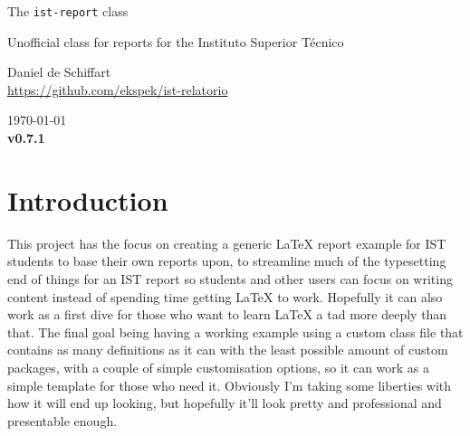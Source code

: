 \documentclass[palatino,english]{ist-report}
\begin{document}
\institution{}
\title{}

\begin{center}
	\vspace*{1cm}
	{\huge The \texttt{ist-report} class}
	\medskip\par
	{\Large Unofficial class for reports for the Instituto Superior Técnico}
	\bigskip\bigskip\par
	{\large Daniel de Schiffart} \\
	{\url{https://github.com/ekspek/ist-relatorio}}
	\bigskip\smallskip\par
	\today \\
	\textbf{v0.7.1}
\end{center}
\vspace*{1cm}

\begin{abstract}
	This \LaTeX{} class was developed as an unofficial template for reports developed for the Instituto Superior Técnico of Universidade de Lisboa, themed around the style the university has developed for its own internal documentation, complemented by using specifications defined by the university itself, all the while taking some creative liberties with the missing definitions.
	
	This document details the class file, what it exactly contains, what its options are, and a concise documentation of its development, which will grow as the class file progresses. The class file itself, \texttt{ist-report.cls}, should be in the same directory as the \texttt{doc.tex} file.
\end{abstract}

\tableofcontents

\section{Introduction}

This project has the focus on creating a generic \LaTeX{} report example for IST students to base their own reports upon, to streamline much of the typesetting end of things for an IST report so students and other users can focus on writing content instead of spending time getting \LaTeX{} to work. Hopefully it can also work as a first dive for those who want to learn \LaTeX{} a tad more deeply than that. The final goal being having a working example using a custom class file that contains as many definitions as it can with the least possible amount of custom packages, with a couple of simple customisation options, so it can work as a simple template for those who need it. Obviously I'm taking some liberties with how it will end up looking, but hopefully it'll look pretty and professional and presentable enough.
\end{document}
